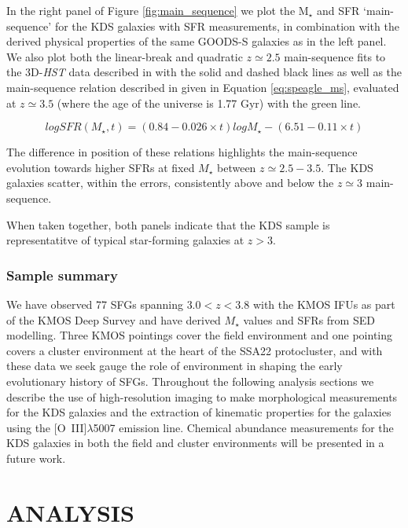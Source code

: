 \documentclass[fleqn,usenatbib]{mnras}
\begin{document}
In the right panel of Figure \ref{fig:main_sequence} we plot the M$_{\star}$ and SFR `main-sequence' for the KDS galaxies with SFR measurements, in combination with the derived physical properties of the same GOODS-S galaxies as in the left panel.
We also plot both the linear-break and quadratic $z\simeq2.5$ main-sequence fits to the 3D-{\em HST} data described in \cite{Whitaker2014} with the solid and dashed black lines as well as the main-sequence relation described in \cite{Speagle2014} given in Equation \ref{eq:speagle_ms}, evaluated at $z\simeq3.5$ (where the age of the universe is 1.77 Gyr) with the green line.

\begin{equation}\label{eq:speagle_ms}
logSFR(M_{\star}, t) = (0.84 - 0.026 \times t)logM_{\star} - (6.51 - 0.11 \times t)
\end{equation}

The difference in position of these relations highlights the main-sequence evolution towards higher SFRs at fixed $M_{\star}$ between $z\simeq2.5-3.5$.
The KDS galaxies scatter, within the errors, consistently above and below the $z\simeq3$ main-sequence.

When taken together, both panels indicate that the KDS sample is representatitve of typical star-forming galaxies at $z>3$.

\subsubsection{Sample summary}\label{subsubsec:sample_summary}
We have observed 77 SFGs spanning $3.0 < z < 3.8$ with the KMOS IFUs as part of the KMOS Deep Survey and have derived $M_{\star}$ values and SFRs from SED modelling.
Three KMOS pointings cover the field environment and one pointing covers a cluster environment at the heart of the SSA22 protocluster, and with these data we seek gauge the role of environment in shaping the early evolutionary history of SFGs.
Throughout the following analysis sections we describe the use of high-resolution imaging to make morphological measurements for the KDS galaxies and the extraction of kinematic properties for the galaxies using the [O~{\sc III}]$\lambda$5007 emission line.
Chemical abundance measurements for the KDS galaxies in both the field and cluster environments will be presented in a future work.

\section{ANALYSIS}\label{sec:analysis}
\end{document}
